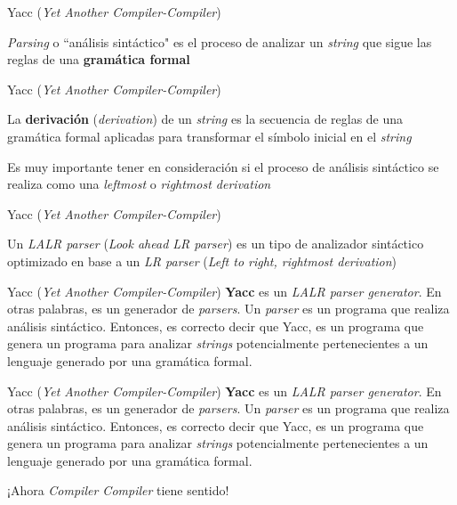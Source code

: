 \documentclass[pdf]{beamer}
\begin{document}
	\begin{frame}{Yacc (\emph{Yet Another Compiler-Compiler})}
		\begin{definition}
			\emph{Parsing} o ``análisis sintáctico" es el proceso de analizar un \emph{string} que sigue las reglas de una \textbf{gramática formal}
		\end{definition}
	\end{frame}
	
	\begin{frame}{Yacc (\emph{Yet Another Compiler-Compiler})}
		\begin{definition}
			La \textbf{derivación} (\emph{derivation}) de un \emph{string} es la secuencia de reglas de una gramática formal aplicadas para transformar el símbolo inicial en el \emph{string}
		\end{definition}
		\justifying
		Es muy importante tener en consideración si el proceso de análisis sintáctico se realiza como una \emph{leftmost} o \emph{rightmost derivation}
	\end{frame}
	
	\begin{frame}{Yacc (\emph{Yet Another Compiler-Compiler})}
		\begin{definition}
			Un \emph{LALR parser} (\emph{Look ahead LR parser}) es un tipo de analizador sintáctico optimizado en base a un \emph{LR parser} (\emph{Left to right, rightmost derivation})
		\end{definition}
	\end{frame}
	
	\begin{frame}{Yacc (\emph{Yet Another Compiler-Compiler})}
		\textbf{Yacc} es un \emph{LALR parser generator}. En otras palabras, es un generador de \emph{parsers}. Un \emph{parser} es un programa que realiza análisis sintáctico. Entonces, es correcto decir que Yacc, es un programa que genera un programa para analizar \emph{strings} potencialmente pertenecientes a un lenguaje generado por una gramática formal.
	\end{frame}
	
	\begin{frame}{Yacc (\emph{Yet Another Compiler-Compiler})}
		\textbf{Yacc} es un \emph{LALR parser generator}. En otras palabras, es un generador de \emph{parsers}. Un \emph{parser} es un programa que realiza análisis sintáctico. Entonces, es correcto decir que Yacc, es un programa que genera un programa para analizar \emph{strings} potencialmente pertenecientes a un lenguaje generado por una gramática formal.
		
		\medskip
		\centering
		¡Ahora \emph{Compiler Compiler} tiene sentido!
	\end{frame}
	
\end{document}
